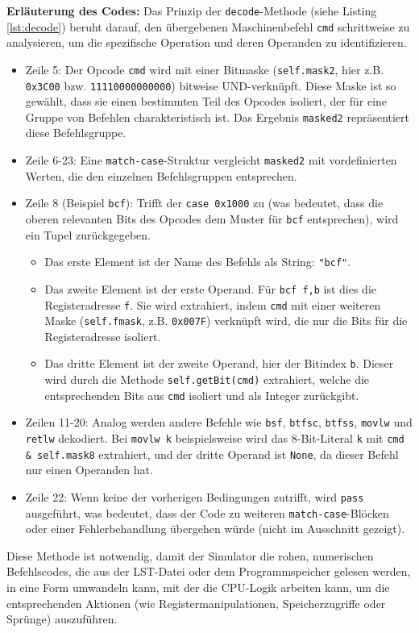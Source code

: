 \textbf{Erläuterung des Codes:}
Das Prinzip der \texttt{decode}-Methode (siehe Listing \ref{lst:decode}) beruht darauf, den übergebenen Maschinenbefehl \texttt{cmd} schrittweise zu analysieren, um die spezifische Operation und deren Operanden zu identifizieren.
\begin{itemize}
    \item Zeile 5: Der Opcode \texttt{cmd} wird mit einer Bitmaske (\texttt{self.mask2}, hier z.B. \texttt{0x3C00} bzw. \texttt{11110000000000}) bitweise UND-verknüpft. Diese Maske ist so gewählt, dass sie einen bestimmten Teil des Opcodes isoliert, der für eine Gruppe von Befehlen charakteristisch ist. Das Ergebnis \texttt{masked2} repräsentiert diese Befehlsgruppe.
    \item Zeile 6-23: Eine \texttt{match-case}-Struktur vergleicht \texttt{masked2} mit vordefinierten Werten, die den einzelnen Befehlsgruppen entsprechen.
    \item Zeile 8 (Beispiel \texttt{bcf}): Trifft der \texttt{case 0x1000} zu (was bedeutet, dass die oberen relevanten Bits des Opcodes dem Muster für \texttt{bcf} entsprechen), wird ein Tupel zurückgegeben.
    \begin{itemize}
        \item Das erste Element ist der Name des Befehls als String: \texttt{"bcf"}.
        \item Das zweite Element ist der erste Operand. Für \texttt{bcf f,b} ist dies die Registeradresse \texttt{f}. Sie wird extrahiert, indem \texttt{cmd} mit einer weiteren Maske (\texttt{self.fmask}, z.B. \texttt{0x007F}) verknüpft wird, die nur die Bits für die Registeradresse isoliert.
        \item Das dritte Element ist der zweite Operand, hier der Bitindex \texttt{b}. Dieser wird durch die Methode \texttt{self.getBit(cmd)} extrahiert, welche die entsprechenden Bits aus \texttt{cmd} isoliert und als Integer zurückgibt.
    \end{itemize}
    \item Zeilen 11-20: Analog werden andere Befehle wie \texttt{bsf}, \texttt{btfsc}, \texttt{btfss}, \texttt{movlw} und \texttt{retlw} dekodiert. Bei \texttt{movlw k} beispielsweise wird das 8-Bit-Literal \texttt{k} mit \texttt{cmd \& self.mask8} extrahiert, und der dritte Operand ist \texttt{None}, da dieser Befehl nur einen Operanden hat.
    \item Zeile 22: Wenn keine der vorherigen Bedingungen zutrifft, wird \texttt{pass} ausgeführt, was bedeutet, dass der Code zu weiteren \texttt{match-case}-Blöcken oder einer Fehlerbehandlung übergehen würde (nicht im Ausschnitt gezeigt).
\end{itemize}
Diese Methode ist notwendig, damit der Simulator die rohen, numerischen Befehlscodes, die aus der LST-Datei oder dem Programmspeicher gelesen werden, in eine Form umwandeln kann, mit der die CPU-Logik arbeiten kann, um die entsprechenden Aktionen (wie Registermanipulationen, Speicherzugriffe oder Sprünge) auszuführen.

